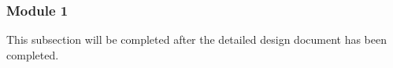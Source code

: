 \documentclass[12pt, titlepage]{article}
\begin{document}

\subsubsection{Module 1}

This subsection will be completed after the detailed design document has been completed.





					
					
					


					

					
					
					



    
\end{document}
